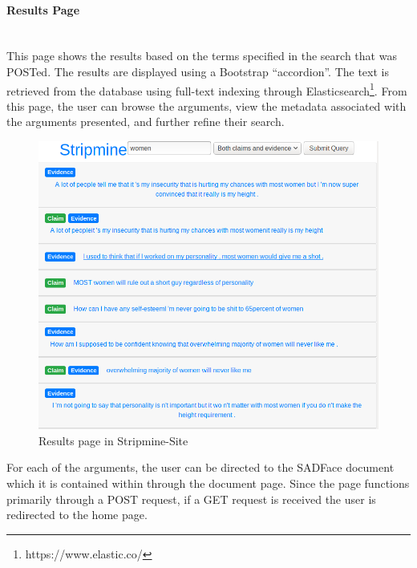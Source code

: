 \documentclass[12pt,a4paper]{article}
\begin{document}
\paragraph{Results Page}\mbox{}\\

This page shows the results based on the terms specified in the search that was POSTed. The results are displayed using a Bootstrap ``accordion''. The text is retrieved from the database using full-text indexing through Elasticsearch\footnote{https://www.elastic.co/}. From this page, the user can browse the arguments, view the metadata associated with the arguments presented, and further refine their search.
\newline
\begin{figure}[H]
    \centering
    \includegraphics[scale=0.5]{Report/graphics/results-1.png}
    \caption{Results page in Stripmine-Site}
    \label{fig:results1}
\end{figure}

For each of the arguments, the user can be directed to the SADFace document which it is contained within through the document page. Since the page functions primarily through a POST request, if a GET request is received the user is redirected to the home page.
\end{document}
